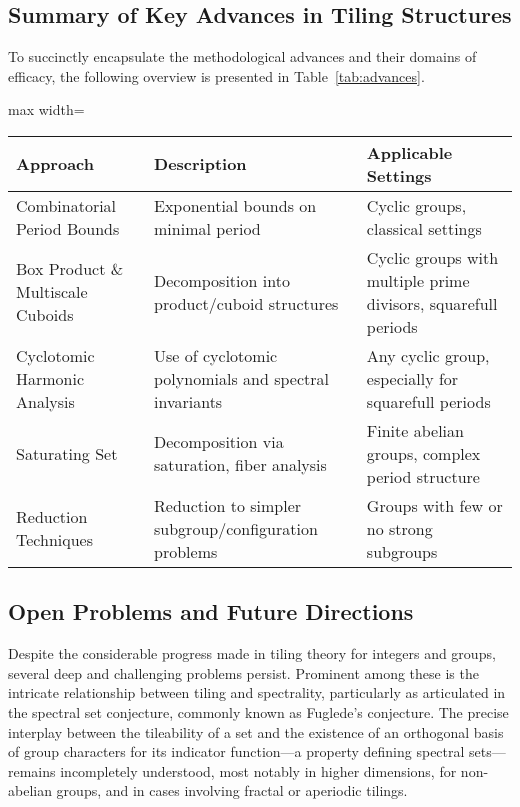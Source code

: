 \subsection{Summary of Key Advances in Tiling Structures}

To succinctly encapsulate the methodological advances and their domains of efficacy, the following overview is presented in Table~\ref{tab:advances}.

\begin{table*}[htbp]
\centering
\caption{Major Approaches in Tiling Theory and Their Domains of Applicability}
\label{tab:advances}
\begin{adjustbox}{max width=\textwidth}
\begin{tabular}{lll}
\toprule
\textbf{Approach} & \textbf{Description} & \textbf{Applicable Settings} \\
\midrule
Combinatorial Period Bounds & Exponential bounds on minimal period & Cyclic groups, classical settings \\
Box Product \& Multiscale Cuboids & Decomposition into product/cuboid structures & Cyclic groups with multiple prime divisors, squarefull periods \\
Cyclotomic Harmonic Analysis & Use of cyclotomic polynomials and spectral invariants & Any cyclic group, especially for squarefull periods \\
Saturating Set & Decomposition via saturation, fiber analysis & Finite abelian groups, complex period structure \\
Reduction Techniques & Reduction to simpler subgroup/configuration problems & Groups with few or no strong subgroups \\
\bottomrule
\end{tabular}
\end{adjustbox}
\end{table*}

\subsection{Open Problems and Future Directions}

Despite the considerable progress made in tiling theory for integers and groups, several deep and challenging problems persist. Prominent among these is the intricate relationship between tiling and spectrality, particularly as articulated in the spectral set conjecture, commonly known as Fuglede’s conjecture. The precise interplay between the tileability of a set and the existence of an orthogonal basis of group characters for its indicator function—a property defining spectral sets—remains incompletely understood, most notably in higher dimensions, for non-abelian groups, and in cases involving fractal or aperiodic tilings.

